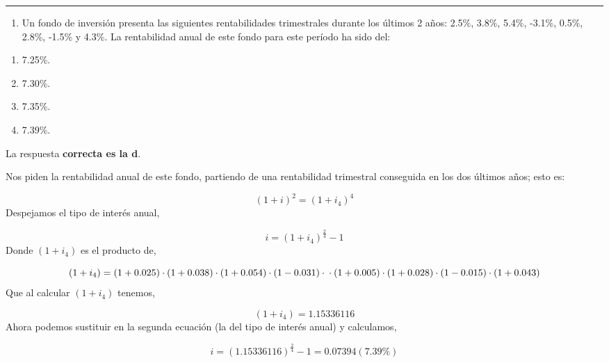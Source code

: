 \documentclass[
  letterpaper,
  DIV=11,
  numbers=noendperiod]{scrreprt}
\providecommand{\tightlist}{%
  \setlength{\itemsep}{0pt}\setlength{\parskip}{0pt}}\usepackage{longtable,booktabs,array}
\begin{document}
\begin{center}\rule{0.5\linewidth}{0.5pt}\end{center}

\begin{enumerate}
\def\labelenumi{\arabic{enumi}.}
\setcounter{enumi}{66}
\tightlist
\item
  Un fondo de inversión presenta las siguientes rentabilidades
  trimestrales durante los últimos 2 años: 2.5\%, 3.8\%, 5.4\%, -3.1\%,
  0.5\%, 2.8\%, -1.5\% y 4.3\%. La rentabilidad anual de este fondo para
  este período ha sido del:
\end{enumerate}

\begin{enumerate}
\def\labelenumi{\alph{enumi})}
\item
  7.25\%.
\item
  7.30\%.
\item
  7.35\%.
\item
  7.39\%.
\end{enumerate}

\begin{tcolorbox}[enhanced jigsaw, left=2mm, opacityback=0, colback=white, breakable, arc=.35mm, bottomrule=.15mm, rightrule=.15mm, toprule=.15mm, leftrule=.75mm, colframe=quarto-callout-tip-color-frame]
\begin{minipage}[t]{5.5mm}
\textcolor{quarto-callout-tip-color}{\faLightbulb}
\end{minipage}%
\begin{minipage}[t]{\textwidth - 5.5mm}

La respuesta \textbf{correcta es la d}.

Nos piden la rentabilidad anual de este fondo, partiendo de una
rentabilidad trimestral conseguida en los dos últimos años; esto es:

\[\left(1+i\right)^2=\left(1+i_4\right)^4\] Despejamos el tipo de
interés anual,

\[i=\left(1+i_4\right)^{\frac{2 }{4 }}-1\] Donde \(\left(1+i_4\right)\)
es el producto de,

\[\left(1+i_4\right)=\left(1+0.025\right)\cdot\left(1+0.038\right)\cdot\left(1+0.054\right)\cdot\left(1-0.031\right)\cdot\\\cdot\left(1+0.005\right)\cdot\left(1+0.028\right)\cdot\left(1-0.015\right)\cdot\left(1+0.043\right)\]
Que al calcular \(\left(1+i_4\right)\) tenemos,

\[\left(1+i_4\right)=1.15336116\] Ahora podemos sustituir en la segunda
ecuación (la del tipo de interés anual) y calculamos,

\[i=(1.15336116)^{\frac{2 }{4 }}-1=0.07394(7.39\%)\]

\end{minipage}%
\end{tcolorbox}
\end{document}
